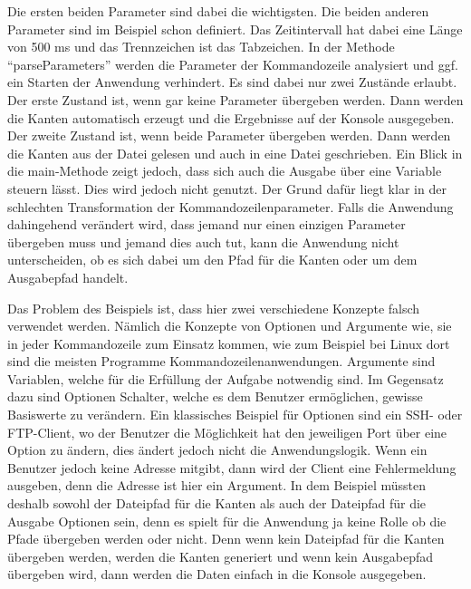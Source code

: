 Die ersten beiden Parameter sind dabei die wichtigsten. Die beiden anderen
Parameter sind im Beispiel schon definiert. Das Zeitintervall hat dabei eine
Länge von 500 ms und das Trennzeichen ist das Tabzeichen. In der Methode
\enquote{parseParameters} werden die Parameter der Kommandozeile analysiert und
ggf. ein Starten der Anwendung verhindert. Es sind dabei nur zwei Zustände
erlaubt. Der erste Zustand ist, wenn gar keine Parameter übergeben werden. Dann
werden die Kanten automatisch erzeugt und die Ergebnisse auf der Konsole
ausgegeben. Der zweite Zustand ist, wenn beide Parameter übergeben werden. Dann
werden die Kanten aus der Datei gelesen und auch in eine Datei geschrieben. Ein
Blick in die main-Methode zeigt jedoch, dass sich auch die Ausgabe über eine
Variable steuern lässt. Dies wird jedoch nicht genutzt. Der Grund dafür liegt
klar in der schlechten Transformation der Kommandozeilenparameter. Falls die
Anwendung dahingehend verändert wird, dass jemand nur einen einzigen Parameter
übergeben muss und jemand dies auch tut, kann die Anwendung nicht unterscheiden,
ob es sich dabei um den Pfad für die Kanten oder um dem Ausgabepfad handelt.

Das Problem des Beispiels ist, dass hier zwei verschiedene Konzepte falsch
verwendet werden. Nämlich die Konzepte von Optionen und Argumente wie, sie in
jeder Kommandozeile zum Einsatz kommen, wie zum Beispiel bei Linux dort sind die
meisten Programme Kommandozeilenanwendungen. Argumente sind Variablen, welche für
die Erfüllung der Aufgabe notwendig sind. Im Gegensatz dazu sind Optionen
Schalter, welche es dem Benutzer ermöglichen, gewisse Basiswerte zu verändern.
Ein klassisches Beispiel für Optionen sind ein SSH- oder FTP-Client, wo der
Benutzer die Möglichkeit hat den jeweiligen Port über eine Option zu ändern,
dies ändert jedoch nicht die Anwendungslogik. Wenn ein Benutzer jedoch keine
Adresse mitgibt, dann wird der Client eine Fehlermeldung ausgeben, denn die
Adresse ist hier ein Argument. In dem Beispiel müssten deshalb sowohl der
Dateipfad für die Kanten als auch der Dateipfad für die Ausgabe Optionen sein,
denn es spielt für die Anwendung ja keine Rolle ob die Pfade übergeben werden
oder nicht. Denn wenn kein Dateipfad für die Kanten übergeben werden, werden
die Kanten generiert und wenn kein Ausgabepfad übergeben wird, dann werden die
Daten einfach in die Konsole ausgegeben.


